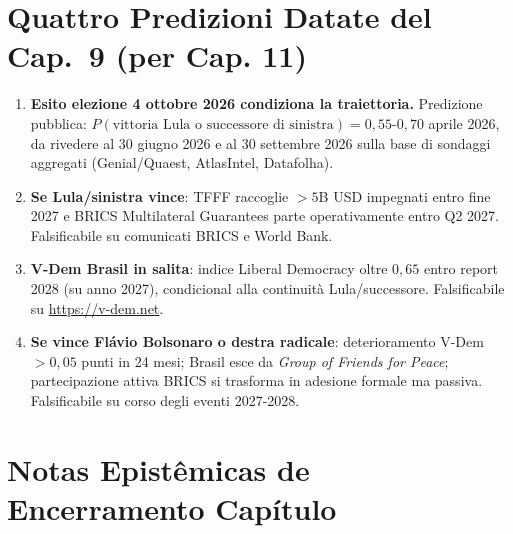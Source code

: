 \section{Quattro Predizioni Datate del Cap.~9 (per Cap.
11)}\label{quattro-predizioni-datate-del-cap.-9-per-cap.-11}

\begin{enumerate}
\def\labelenumi{\arabic{enumi}.}
\tightlist
\item
  \textbf{Esito elezione 4 ottobre 2026 condiziona la traiettoria.}
  Predizione pubblica:
  \(P(\text{vittoria Lula o successore di sinistra}) = 0{,}55\)-\(0{,}70\)
  aprile 2026, da rivedere al 30 giugno 2026 e al 30 settembre 2026
  sulla base di sondaggi aggregati (Genial/Quaest, AtlasIntel,
  Datafolha).
\item
  \textbf{Se Lula/sinistra vince}: TFFF raccoglie \(> 5\)B USD impegnati
  entro fine 2027 e BRICS Multilateral Guarantees parte operativamente
  entro Q2 2027. Falsificabile su comunicati BRICS e World Bank.
\item
  \textbf{V-Dem Brasil in salita}: indice Liberal Democracy oltre
  \(0{,}65\) entro report 2028 (su anno 2027), condicional alla
  continuità Lula/successore. Falsificabile su \url{https://v-dem.net}.
\item
  \textbf{Se vince Flávio Bolsonaro o destra radicale}: deterioramento
  V-Dem \(> 0{,}05\) punti in 24 mesi; Brasil esce da \emph{Group of
  Friends for Peace}; partecipazione attiva BRICS si trasforma in
  adesione formale ma passiva. Falsificabile su corso degli eventi
  2027-2028.
\end{enumerate}



\section{Notas Epistêmicas de Encerramento
Capítulo}\label{note-epistemiche-di-chiusura-capítulo}

